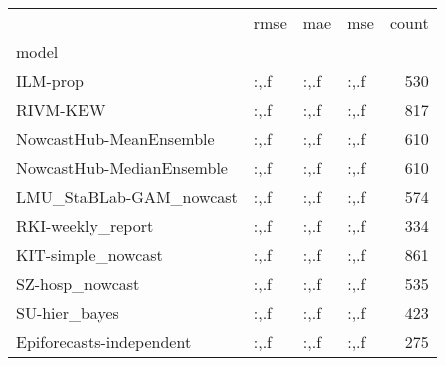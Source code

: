 \begin{tabular}{llllr}
\toprule
 & rmse & mae & mse & count \\
model &  &  &  &  \\
\midrule
ILM-prop & :,.f & :,.f & :,.f & 530 \\
RIVM-KEW & :,.f & :,.f & :,.f & 817 \\
NowcastHub-MeanEnsemble & :,.f & :,.f & :,.f & 610 \\
NowcastHub-MedianEnsemble & :,.f & :,.f & :,.f & 610 \\
LMU_StaBLab-GAM_nowcast & :,.f & :,.f & :,.f & 574 \\
RKI-weekly_report & :,.f & :,.f & :,.f & 334 \\
KIT-simple_nowcast & :,.f & :,.f & :,.f & 861 \\
SZ-hosp_nowcast & :,.f & :,.f & :,.f & 535 \\
SU-hier_bayes & :,.f & :,.f & :,.f & 423 \\
Epiforecasts-independent & :,.f & :,.f & :,.f & 275 \\
\bottomrule
\end{tabular}
